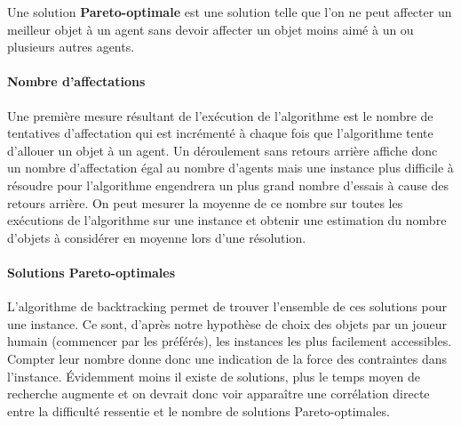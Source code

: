 \documentclass[../main.tex]{subfiles}
\begin{document}
	\begin{definition}
	\label{pareto-def}
	    Une solution \textbf{Pareto-optimale} est une solution telle que l'on ne peut affecter un meilleur objet à un agent sans devoir affecter un objet moins aimé à un ou plusieurs autres agents. 
	\end{definition}
	
	\paragraph{Nombre d'affectations}{Une première mesure résultant de l'exécution de l'algorithme est le nombre de tentatives d'affectation qui est incrémenté à chaque fois que l'algorithme tente d'allouer un objet à un agent. Un déroulement sans retours arrière affiche donc un nombre d'affectation égal au nombre d'agents mais une instance plus difficile à résoudre pour l'algorithme engendrera un plus grand nombre d'essais à cause des retours arrière. On peut mesurer la moyenne de ce nombre sur toutes les exécutions de l'algorithme sur une instance et obtenir une estimation du nombre d'objets à considérer en moyenne lors d'une résolution.}
	
	\paragraph{Solutions Pareto-optimales}{L'algorithme de backtracking permet de trouver l'ensemble de ces solutions pour une instance. Ce sont, d'après notre hypothèse de choix des objets par un joueur humain (commencer par les préférés), les instances les plus facilement accessibles. Compter leur nombre donne donc une indication de la force des contraintes dans l'instance. Évidemment moins il existe de solutions, plus le temps moyen de recherche augmente et on devrait donc voir apparaître une corrélation directe entre la difficulté ressentie et le nombre de solutions Pareto-optimales.}
	
\end{document}
